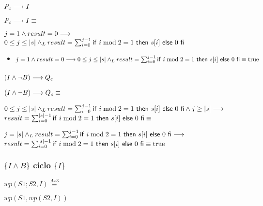 \documentclass{article}
\begin{document}
\subsubsection*{$P_{c} \longrightarrow I$}

$P_{c} \longrightarrow I \equiv$

$j = 1 \wedge result = 0 \longrightarrow$
$0 \leq j \leq |s| \land _L result = \sum_{i=0}^{j-1} \mathsf{if}\ i \bmod 2 = 1\ \mathsf{then}\ s[i]\ \mathsf{else}\ 0\ \mathsf{fi}$

\begin{itemize}
    \item $j = 1 \wedge result = 0 \longrightarrow 0 \leq j \leq |s| \land _L result = \sum_{i=0}^{j-1} \mathsf{if}\ i \bmod 2 = 1\ \mathsf{then}\ s[i]\ \mathsf{else}\ 0\ \mathsf{fi} \equiv \mathrm{true}$
\end{itemize}

\subsubsection*{$(I \wedge \neg B) \longrightarrow Q_{c}$}

$(I \wedge \neg B) \longrightarrow Q_{c} \equiv$

$0 \leq j \leq |s| \land _L result = \sum_{i=0}^{j-1} \mathsf{if}\ i \bmod 2 = 1\ \mathsf{then}\ s[i]\ \mathsf{else}\ 0\ \mathsf{fi} \wedge j \geq |s| \longrightarrow$
$result = \sum_{i=0}^{|s|-1} \mathsf{if}\ i \bmod 2 = 1\ \mathsf{then}\ s[i]\ \mathsf{else}\ 0\ \mathsf{fi} \equiv$

$j = |s| \land _L result = \sum_{i=0}^{j-1} \mathsf{if}\ i \bmod 2 = 1\ \mathsf{then}\ s[i]\ \mathsf{else}\ 0\ \mathsf{fi} \longrightarrow$
$result = \sum_{i=0}^{|s|-1} \mathsf{if}\ i \bmod 2 = 1\ \mathsf{then}\ s[i]\ \mathsf{else}\ 0\ \mathsf{fi} \equiv \mathrm{true}$

\subsubsection*{$\{I \wedge B\}$ ciclo $\{ I \}$}

$wp(S1;S2, I) \stackrel{Ax3}{\equiv}$

$wp(S1, wp(S2, I))$
\end{document}
